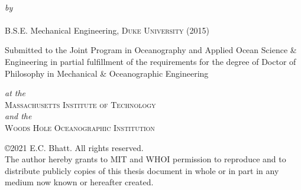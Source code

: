 \def\signature#1#2{\par\noindent#1\dotfill\null\\*
  {\raggedleft #2\par}}


\makeatletter

\begin{titlepage}
  \begin{center}
    \begin{Large}
      \@title
    \end{Large}\\[0.1em]
    \emph{\footnotesize by}\\
    {\large \@author} \\[-0.25em]
    B.S.E. Mechanical Engineering, \textsc{Duke University} (2015) \\ [2em]
    \begin{singlespace}
    {Submitted to the Joint Program in Oceanography and Applied Ocean Science \& Engineering in partial fulfillment of the requirements for the degree of Doctor of Philosophy in Mechanical \& Oceanographic Engineering} \\
    \end{singlespace}
    \emph{\footnotesize at the}\\
    {\large \textsc{Massachusetts Institute of Technology}} \\
    \emph{\footnotesize and the}\\
    {\large \textsc{Woods Hole Oceanographic Institution}} \\ [2em]
    \begin{singlespace}
    {\copyright2021 E.C. Bhatt. All rights reserved. \\ The author hereby grants to MIT and WHOI permission to reproduce and to distribute publicly copies of this thesis document in whole or in part in any medium now known or hereafter created.} \\ [2em]


\end{singlespace}
\end{center}
\end{titlepage}
